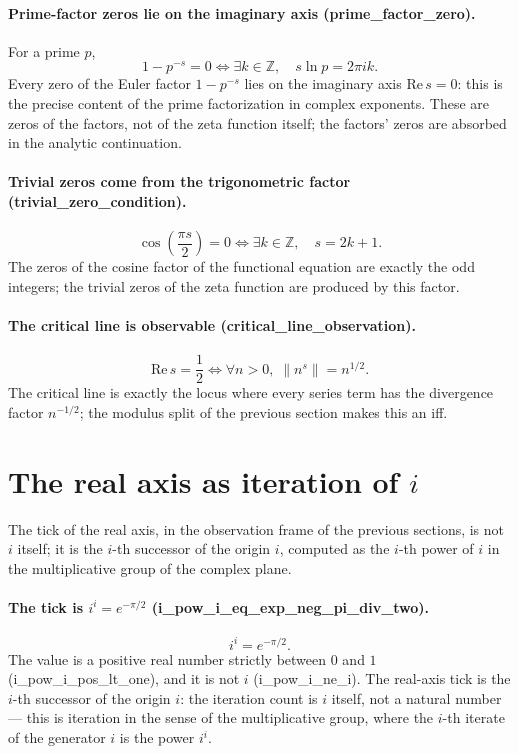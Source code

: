 \documentclass[sigplan,10pt,anonymous,review]{acmart}
\begin{document}
\paragraph{Prime-factor zeros lie on the imaginary axis
(prime\_factor\_zero).} For a prime $p$,
\begin{equation*}
  1 - p^{-s} = 0 \iff \exists k \in \mathbb{Z},\quad s \ln p = 2\pi i k.
\end{equation*}
Every zero of the Euler factor $1 - p^{-s}$ lies on the imaginary axis
$\mathrm{Re}\,s = 0$: this is the precise content of the prime
factorization in complex exponents. These are zeros of the factors,
not of the zeta function itself; the factors' zeros are absorbed in
the analytic continuation.

\paragraph{Trivial zeros come from the trigonometric factor
(trivial\_zero\_condition).}
\begin{equation*}
  \cos\!\left(\frac{\pi s}{2}\right) = 0 \iff \exists k \in \mathbb{Z},\quad s = 2k+1.
\end{equation*}
The zeros of the cosine factor of the functional equation are exactly
the odd integers; the trivial zeros of the zeta function are produced
by this factor.

\paragraph{The critical line is observable
(critical\_line\_observation).}
\begin{equation*}
  \mathrm{Re}\,s = \frac{1}{2} \iff \forall n > 0,\; \|n^s\| = n^{1/2}.
\end{equation*}
The critical line is exactly the locus where every series term has the
divergence factor $n^{-1/2}$; the modulus split of the previous
section makes this an iff.

\section{The real axis as iteration of $i$}

The tick of the real axis, in the observation frame of the previous
sections, is not $i$ itself; it is the $i$-th successor of the origin
$i$, computed as the $i$-th power of $i$ in the multiplicative group of
the complex plane.

\paragraph{The tick is $i^i = e^{-\pi/2}$
(i\_pow\_i\_eq\_exp\_neg\_pi\_div\_two).}
\begin{equation*}
  i^i = e^{-\pi/2}.
\end{equation*}
The value is a positive real number strictly between $0$ and $1$
(i\_pow\_i\_pos\_lt\_one), and it is not $i$
(i\_pow\_i\_ne\_i). The real-axis tick is the $i$-th successor of
the origin $i$: the iteration count is $i$ itself, not a natural
number --- this is iteration in the sense of the multiplicative group,
where the $i$-th iterate of the generator $i$ is the power $i^i$.
\end{document}
